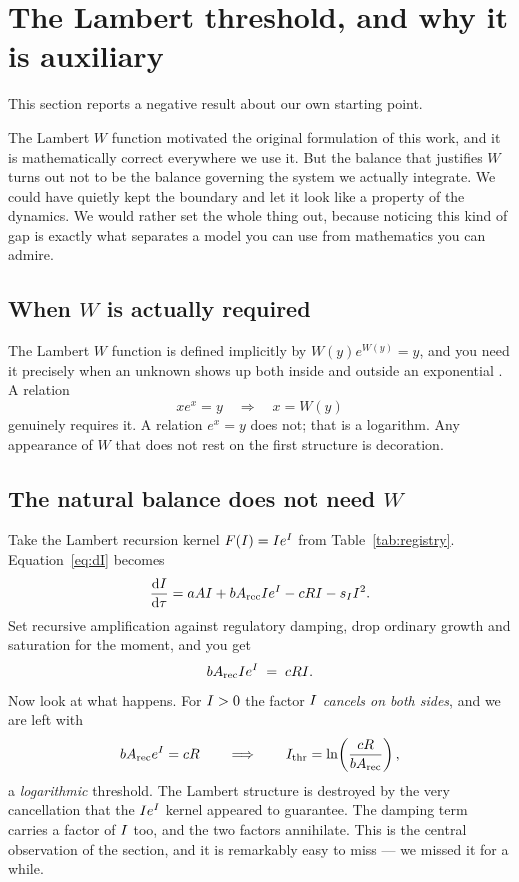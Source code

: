 \section{The Lambert threshold, and why it is auxiliary}
\label{sec:lambert}

This section reports a negative result about our own starting point.

The Lambert $W$ function motivated the original formulation of this work, and it
is mathematically correct everywhere we use it. But the balance that justifies
$W$ turns out not to be the balance governing the system we actually integrate.
We could have quietly kept the boundary and let it look like a property of the
dynamics. We would rather set the whole thing out, because noticing this kind of
gap is exactly what separates a model you can use from mathematics you can
admire.

\subsection{When $W$ is actually required}

The Lambert $W$ function is defined implicitly by $W(y)e^{W(y)} = y$, and you
need it precisely when an unknown shows up both inside and outside an
exponential \citep{corless1996}. A relation
\begin{equation}
  x e^{x} = y \quad\Longrightarrow\quad x = W(y)
\end{equation}
genuinely requires it. A relation $e^{x} = y$ does not; that is a logarithm. Any
appearance of $W$ that does not rest on the first structure is decoration.

\subsection{The natural balance does not need $W$}

Take the Lambert recursion kernel $F(I) = I e^{I}$ from
Table~\ref{tab:registry}. Equation~\eqref{eq:dI} becomes
\begin{equation}
  \frac{\mathrm{d}I}{\mathrm{d}\tau} = a A I + b A_{\mathrm{rec}} I e^{I} - c R I - s_I I^{2}.
\end{equation}
Set recursive amplification against regulatory damping, drop ordinary growth and
saturation for the moment, and you get
\begin{equation}
  b A_{\mathrm{rec}} I e^{I} \;=\; c R I .
\end{equation}
Now look at what happens. For $I > 0$ the factor $I$ \emph{cancels on
both sides}, and we are left with
\begin{equation}
  b A_{\mathrm{rec}} e^{I} = c R
  \qquad\Longrightarrow\qquad
  I_{\mathrm{thr}} = \ln\!\left(\frac{c R}{b A_{\mathrm{rec}}}\right),
  \label{eq:logthreshold}
\end{equation}
a \emph{logarithmic} threshold. The Lambert structure is destroyed by the very
cancellation that the $I e^{I}$ kernel appeared to guarantee. The
damping term carries a factor of $I$ too, and the two factors annihilate.
This is the central observation of the section, and it is remarkably easy to
miss --- we missed it for a while.

